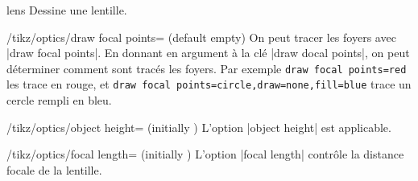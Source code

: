 \documentclass[a4paper]{ltxdoc}
\begin{document}
\begin{shape}{lens}
Dessine une lentille.

\begin{codeexample}[width=6cm]
\end{codeexample}


\begin{codeexample}[width=6cm]
\end{codeexample}

  \begin{stylekey}{/tikz/optics/draw focal points= (default empty)}
  On peut tracer les foyers avec |draw focal points|. En donnant  en argument à la clé |draw docal points|,
  on peut déterminer comment sont tracés les foyers. Par exemple \texttt{draw focal points={red}} les trace en rouge, et \texttt{draw focal points={circle,draw=none,fill=blue}} trace un cercle rempli en bleu.
  \end{stylekey}

  \begin{codeexample}[width=6cm]
\end{codeexample}

\begin{key}{/tikz/optics/object height= (initially )}
    L'option |object height| est applicable.
\end{key}

\begin{key}{/tikz/optics/focal length= (initially )}
    L'option |focal length| contrôle la distance focale de la lentille.

    \begin{codeexample}[width=6cm,pre={\tikzset{every lens node/.append style={optics,draw focal points}}}]
    \end{codeexample}
\end{key}



\end{shape}
\end{document}
